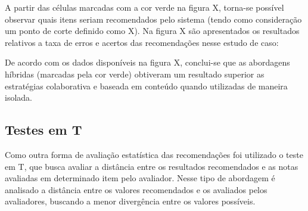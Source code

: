 
A partir das células marcadas com a cor verde na figura X, torna-se possível observar quais itens seriam recomendados pelo sistema (tendo como consideração um ponto de corte definido como X). Na figura X são apresentados os resultados relativos a taxa de erros e acertos das recomendações nesse estudo de caso:


De acordo com os dados disponíveis na figura X, conclui-se que as abordagens híbridas (marcadas pela cor verde) obtiveram um resultado superior as estratégias colaborativa e baseada em conteúdo quando utilizadas de maneira isolada.

\subsection{Testes em T}

Como outra forma de avaliação estatística das recomendações foi utilizado o teste em T, que busca avaliar a distância entre os resultados recomendados e as notas avaliadas em determinado item pelo avaliador. Nesse tipo de abordagem é analisado a distância entre os valores recomendados e os avaliados pelos avaliadores, buscando a menor divergência entre os valores possíveis.